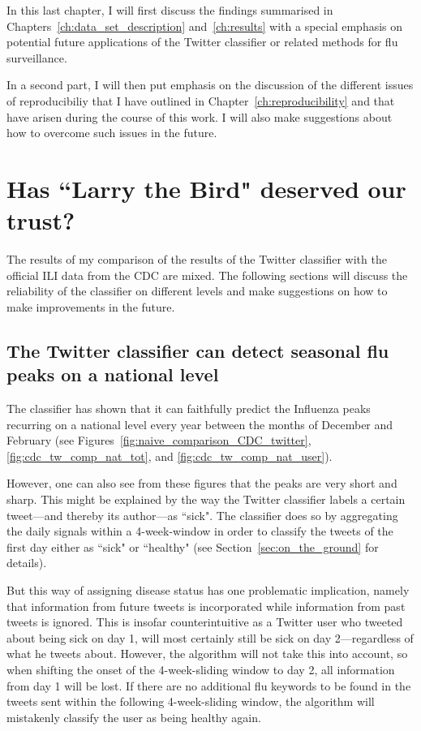 \documentclass[11pt, a4paper,twoside]{report}\usepackage[]{graphicx}\usepackage[]{color}
\begin{document}
In this last chapter, I will first discuss the findings summarised in Chapters~\ref{ch:data_set_description} and~\ref{ch:results} with a special emphasis on potential future applications of the Twitter classifier or related methods for flu surveillance.

In a second part, I will then put emphasis on the discussion of the different issues of reproducibiliy that I have outlined in Chapter~\ref{ch:reproducibility} and that have arisen during the course of this work. I will also make suggestions about how to overcome such issues in the future. 

\section{Has ``Larry the Bird" deserved our trust?}
\label{sec:disc_data_set}

The results of my comparison of the results of the Twitter classifier with the official ILI data from the CDC are mixed. The following sections will discuss the reliability of the classifier on different levels and make suggestions on how to make improvements in the future.

\subsection{The Twitter classifier can detect seasonal flu peaks on a national level}
The classifier has shown that it can faithfully predict the Influenza peaks recurring on a national level every year between the months of December and February (see Figures~\ref{fig:naive_comparison_CDC_twitter}, \ref{fig:cdc_tw_comp_nat_tot}, and \ref{fig:cdc_tw_comp_nat_user}). 

However, one can also see from these figures that the peaks are very short and sharp. This might be explained by the way the Twitter classifier labels a certain tweet---and thereby its author---as ``sick". The classifier does so by aggregating the daily signals within a 4-week-window in order to classify the tweets of the first day either as ``sick" or ``healthy" (see Section~\ref{sec:on_the_ground} for details). 

But this way of assigning disease status has one problematic implication, namely that information from future tweets is incorporated while information from past tweets is ignored. This is insofar counterintuitive as a Twitter user who tweeted about being sick on day 1, will most certainly still be sick on day 2---regardless of what he tweets about. However, the algorithm will not take this into account, so when shifting the onset of the 4-week-sliding window to day 2, all information from day 1 will be lost. If there are no additional flu keywords to be found in the tweets sent within the following 4-week-sliding window, the algorithm will mistakenly classify the user as being healthy again.
\end{document}
